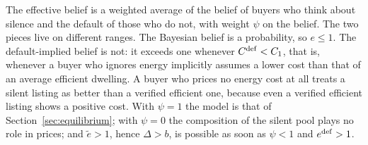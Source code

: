 The effective belief is a weighted average of the belief of buyers who think about silence and the default of those who do not, with weight $\psi$ on the belief. The two pieces live on different ranges. The Bayesian belief is a probability, so $e\le1$. The default-implied belief is not: it exceeds one whenever $C^{\rm def}<C_1$, that is, whenever a buyer who ignores energy implicitly assumes a lower cost than that of an average efficient dwelling. A buyer who prices no energy cost at all treats a silent listing as better than a verified efficient one, because even a verified efficient listing shows a positive cost. With $\psi=1$ the model is that of Section~\ref{sec:equilibrium}; with $\psi=0$ the composition of the silent pool plays no role in prices; and $\tilde e>1$, hence $\Delta>b$, is possible as soon as $\psi<1$ and $e^{\rm def}>1$.
